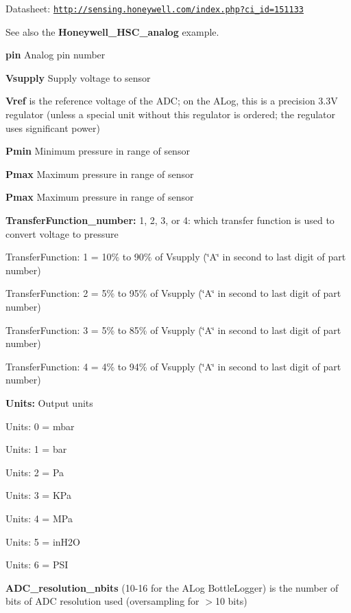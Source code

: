 Datasheet\+: \href{http://sensing.honeywell.com/index.php?ci_id=151133}{\tt http\+://sensing.\+honeywell.\+com/index.\+php?ci\+\_\+id=151133}

See also the {\bfseries Honeywell\+\_\+\+H\+S\+C\+\_\+analog} example.

{\bfseries pin} Analog pin number

{\bfseries Vsupply} Supply voltage to sensor

{\bfseries Vref} is the reference voltage of the A\+DC; on the A\+Log, this is a precision 3.\+3V regulator (unless a special unit without this regulator is ordered; the regulator uses significant power)

{\bfseries Pmin} Minimum pressure in range of sensor

{\bfseries Pmax} Maximum pressure in range of sensor

{\bfseries Pmax} Maximum pressure in range of sensor

{\bfseries Transfer\+Function\+\_\+number\+:} 1, 2, 3, or 4\+: which transfer function is used to convert voltage to pressure
\begin{DoxyItemize}
\item Transfer\+Function\+: 1 = 10\% to 90\% of Vsupply (\char`\"{}\+A\char`\"{} in second to last digit of part number)
\item Transfer\+Function\+: 2 = 5\% to 95\% of Vsupply (\char`\"{}\+A\char`\"{} in second to last digit of part number)
\item Transfer\+Function\+: 3 = 5\% to 85\% of Vsupply (\char`\"{}\+A\char`\"{} in second to last digit of part number)
\item Transfer\+Function\+: 4 = 4\% to 94\% of Vsupply (\char`\"{}\+A\char`\"{} in second to last digit of part number)
\end{DoxyItemize}

{\bfseries Units\+:} Output units
\begin{DoxyItemize}
\item Units\+: 0 = mbar
\item Units\+: 1 = bar
\item Units\+: 2 = Pa
\item Units\+: 3 = K\+Pa
\item Units\+: 4 = M\+Pa
\item Units\+: 5 = in\+H2O
\item Units\+: 6 = P\+SI
\end{DoxyItemize}

{\bfseries A\+D\+C\+\_\+resolution\+\_\+nbits} (10-\/16 for the A\+Log Bottle\+Logger) is the number of bits of A\+DC resolution used (oversampling for $>$10 bits)

